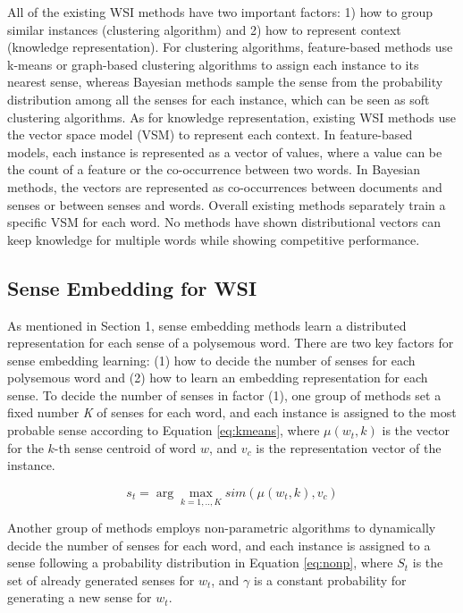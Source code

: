 \documentclass[11pt]{article}
\newcommand{\argmax}{\arg\!\max}
\begin{document}
All of the existing WSI methods have two important factors: 1) how to group similar instances (clustering algorithm) and 2) how to represent context (knowledge representation).
For clustering algorithms, 
feature-based methods use k-means or graph-based clustering algorithms to assign each instance to its nearest sense, 
whereas Bayesian methods sample the sense from the probability distribution among all the senses for each instance, 
which can be seen as soft clustering algorithms. 
As for knowledge representation, existing WSI methods use the vector space model (VSM) to represent each context. 
In feature-based models, each instance is represented as a vector of values, where a value can be the count of a feature or the co-occurrence between two words.
In Bayesian methods, 
the vectors are represented as co-occurrences between documents and senses or between senses and words.
Overall existing methods separately train a specific VSM for each word.
No methods have shown distributional vectors can keep knowledge for multiple words while showing competitive performance.



\subsection{Sense Embedding for WSI}





As mentioned in Section 1, sense embedding methods learn a distributed representation for
each sense of a polysemous word. There are two key factors for sense embedding learning: (1) how to decide the number of senses for each polysemous word and (2) how to learn an embedding representation for each sense. 
To decide the number of senses in factor (1), one group of methods \cite{huang-EtAl:2012:ACL20122,neelakantan-EtAl:2014:EMNLP2014} set a fixed number \emph{K} of senses for each word, and each instance is assigned to the most probable sense according to Equation \ref{eq:kmeans}, where $\mu(w_t,k)$ is the vector for the $k$-th sense centroid of word $w$, and $v_c$ is the representation vector of the instance.

\begin{equation} \label{eq:kmeans}
    s_t = \argmax_{k=1,..,K} sim(\mu(w_t,k),v_c)
\end{equation}

Another group of methods \cite{li-jurafsky:2015:EMNLP} employs non-parametric algorithms to dynamically decide the number of senses for each word, and 
each instance is assigned to a sense following a probability distribution in Equation \ref{eq:nonp}, where $S_t$ is the set of already generated senses for $w_t$, and $\gamma$ is a constant probability for generating a new sense for $w_t$.
\end{document}
